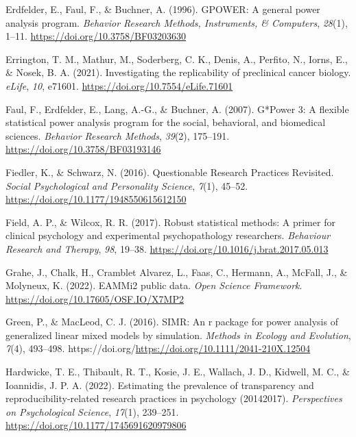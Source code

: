 \documentclass[
  man]{apa7}
\newlength{\cslhangindent}
\newenvironment{CSLReferences}[2] %
 {\begin{list}{}{%
  \setlength{\itemindent}{0pt}
  \setlength{\leftmargin}{0pt}
  \setlength{\parsep}{0pt}
  \ifodd #1
   \setlength{\leftmargin}{\cslhangindent}
   \setlength{\itemindent}{-1\cslhangindent}
  \fi
  \setlength{\itemsep}{#2\baselineskip}}}
 {\end{list}}
\begin{document}
\begin{CSLReferences}{1}{0}
Erdfelder, E., Faul, F., \& Buchner, A. (1996). GPOWER: A general power analysis program. \emph{Behavior Research Methods, Instruments, \& Computers}, \emph{28}(1), 1--11. \url{https://doi.org/10.3758/BF03203630}

Errington, T. M., Mathur, M., Soderberg, C. K., Denis, A., Perfito, N., Iorns, E., \& Nosek, B. A. (2021). Investigating the replicability of preclinical cancer biology. \emph{eLife}, \emph{10}, e71601. \url{https://doi.org/10.7554/eLife.71601}

Faul, F., Erdfelder, E., Lang, A.-G., \& Buchner, A. (2007). G*Power 3: A flexible statistical power analysis program for the social, behavioral, and biomedical sciences. \emph{Behavior Research Methods}, \emph{39}(2), 175--191. \url{https://doi.org/10.3758/BF03193146}

Fiedler, K., \& Schwarz, N. (2016). Questionable Research Practices Revisited. \emph{Social Psychological and Personality Science}, \emph{7}(1), 45--52. \url{https://doi.org/10.1177/1948550615612150}

Field, A. P., \& Wilcox, R. R. (2017). Robust statistical methods: A primer for clinical psychology and experimental psychopathology researchers. \emph{Behaviour Research and Therapy}, \emph{98}, 19--38. \url{https://doi.org/10.1016/j.brat.2017.05.013}

Grahe, J., Chalk, H., Cramblet Alvarez, L., Faas, C., Hermann, A., McFall, J., \& Molyneux, K. (2022). EAMMi2 public data. \emph{Open Science Framework}. \url{https://doi.org/10.17605/OSF.IO/X7MP2}

Green, P., \& MacLeod, C. J. (2016). SIMR: An r package for power analysis of generalized linear mixed models by simulation. \emph{Methods in Ecology and Evolution}, \emph{7}(4), 493--498. https://doi.org/\url{https://doi.org/10.1111/2041-210X.12504}

Hardwicke, T. E., Thibault, R. T., Kosie, J. E., Wallach, J. D., Kidwell, M. C., \& Ioannidis, J. P. A. (2022). Estimating the prevalence of transparency and reproducibility-related research practices in psychology (2014{\textendash}2017). \emph{Perspectives on Psychological Science}, \emph{17}(1), 239--251. \url{https://doi.org/10.1177/1745691620979806}


\end{CSLReferences}
\end{document}
